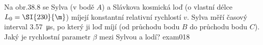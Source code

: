 \begin{fyzexam}{Na obr.38.8 se Sylva (v bodě \(A\)) a Slávkova kosmická loď (o vlastní délce \(L_0 =
  \protect\SI{230}{\m}\)) míjejí konstantní relativní rychlostí \(v\). Sylva měří časový
  interval \protect\SI{3.57}{\micro\s}, po který ji loď míjí (od průchodu bodu \(B\) do průchodu
  bodu \(C\)). Jaký je rychlostní parametr \(β\) mezi Sylvou a lodí?
  \hfill\cite[s.~1015]{Halliday2001}}{exam018} 

  {\centering
  \captionsetup{type=figure}
  \par} 

\end{fyzexam}